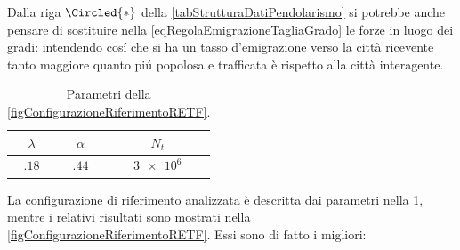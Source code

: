 
      Dalla riga \(\Circled{\ast}\) della \cref{tabStrutturaDatiPendolarismo} si potrebbe anche pensare di sostituire nella \ref{eqRegolaEmigrazioneTagliaGrado} le forze in luogo dei gradi:
      intendendo cosí che si ha un tasso d'emigrazione verso la città ricevente tanto maggiore quanto piú popolosa e trafficata è rispetto alla città interagente.

      \begin{table}[htb]
        \centering
        \caption{Parametri della \cref{figConfigurazioneRiferimentoRETF}.}
        \begin{tabular}{ccc}
          \hline
          \(\lambda\)&\(\alpha\)&\(N_t\)\\
          \hline
          \(\num{.18}\)&\(\num{.44}\)&\(\num{3e6}\)\\
          \hline
        \end{tabular}
        \label{tabParametriRETF}
      \end{table}

      La configurazione di riferimento analizzata è descritta dai parametri nella \cref{tabParametriRETF}, mentre i relativi risultati sono mostrati nella \cref{figConfigurazioneRiferimentoRETF}. Essi sono di fatto i migliori: 

